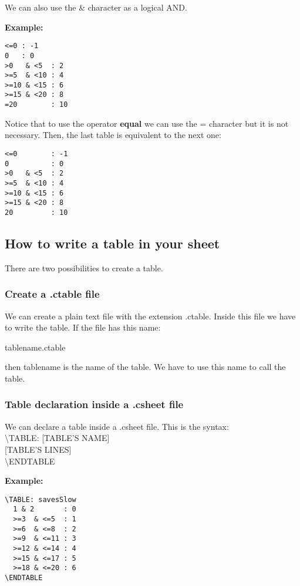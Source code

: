 \documentclass[11pt,a4paper,openright,oneside]{book}
\newenvironment{ex}
{
  \setlength{\parindent}{0cm}
  \large \textbf{Example:} \normalsize 
}
{}
\begin{document}
  We can also use the \textsf{\&} character as a logical AND.

\begin{ex} \begin{lstlisting}
<=0 : -1
0   : 0 
>0   & <5  : 2 
>=5  & <10 : 4 
>=10 & <15 : 6 
>=15 & <20 : 8 
=20        : 10 
\end{lstlisting} \end{ex}

  Notice that to use the operator \textbf{equal} we can use the \textsf{=} character but it is not necessary. Then, the last table is equivalent to the next one:

\begin{lstlisting}
<=0        : -1
0          : 0 
>0   & <5  : 2 
>=5  & <10 : 4 
>=10 & <15 : 6 
>=15 & <20 : 8 
20         : 10 
\end{lstlisting}

\subsection{How to write a table in your sheet}

There are two possibilities to create a table.

\subsubsection{Create a .ctable file}

We can create a plain text file with the extension \textsf{.ctable}. Inside this file we have to write the table. If the file has this name:
\begin{center} \textsf{tablename.ctable} \end{center}
then \textsf{tablename} is the name of the table. We have to use this name to call the table.

\subsubsection{Table declaration inside a .csheet file}

We can declare a table inside a .csheet file. This is the syntax: \vspace{5px}\\
\textsf{\textbackslash TABLE: \textsc{\scriptsize[TABLE'S NAME]}} \\
\textsc{\scriptsize[TABLE'S LINES]}\\
\textsf{\textbackslash ENDTABLE}

\begin{ex}
  \begin{lstlisting}
\TABLE: savesSlow
  1 & 2       : 0
  >=3  & <=5  : 1
  >=6  & <=8  : 2
  >=9  & <=11 : 3
  >=12 & <=14 : 4
  >=15 & <=17 : 5
  >=18 & <=20 : 6
\ENDTABLE
  \end{lstlisting}
\end{ex}
\end{document}
